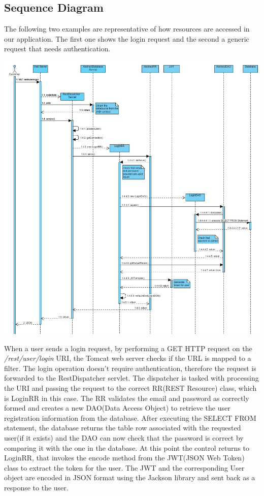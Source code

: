 \subsection{Sequence Diagram}

The following two examples are representative of how resources are accessed in our application. The first one shows the login request and the second a generic request that needs authentication.

\begin{center}
    \includegraphics[width=1.0\textwidth]{resources/Sequence-Diagram-Login}
    \label{fig:sequence-diagram-login}
\end{center}

When a user sends a login request, by performing a GET HTTP request on the \textit{/rest/user/login} URI, the Tomcat web server checks if the URL is mapped to a filter. The login operation doesn't require authentication, therefore the request is forwarded to the RestDispatcher servlet. The dispatcher is tasked with processing the URI and passing the request to the correct RR(REST Resource) class, which is LoginRR in this case. The RR validates the email and password as correctly formed and creates a new DAO(Data Access Object) to retrieve the user registration information from the database. After executing the SELECT FROM statement, the database returns the table row associated with the requested user(if it exists) and the DAO can now check that the password is correct by comparing it with the one in the database. At this point the control returns to LoginRR, that invokes the encode method from the JWT(JSON Web Token) class to extract the token for the user. The JWT and the corresponding User object are encoded in JSON format using the Jackson library and sent back as a response to the user.

